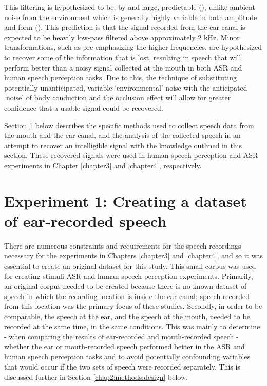 This filtering is hypothesized to be, by and large, predictable (\cite{hansen:97b,reinfeldt:10}), unlike ambient noise from the environment which is generally highly variable in both amplitude and form (\cite{zhang:17}). This prediction is that the signal recorded from the ear canal is expected to be heavily low-pass filtered above approximately 2 kHz.  Minor transformations, such as pre-emphasizing the higher frequencies, are hypothesized to recover some of the information that is lost, resulting in speech that will perform better than a noisy signal collected at the mouth in both ASR and human speech perception tasks.
Due to this, the technique of substituting potentially unanticipated, variable `environmental' noise with the anticipated `noise' of body conduction and the occlusion effect will allow for greater confidence that a usable signal could be recovered.    

Section \ref{expt1} below describes the specific methods used to collect speech data from the mouth and the ear canal, and the analysis of the collected speech in an attempt to recover an intelligible signal with the knowledge outlined in this section.  These recovered signals were used in human speech perception and ASR experiments in Chapter \ref{chapter3} and \ref{chapter4}, respectively.


\section{Experiment 1: Creating a dataset of ear-recorded speech}\label{expt1}

There are numerous constraints and requirements for the speech recordings necessary for the experiments in Chapters \ref{chapter3} and \ref{chapter4}, and so it was essential to create an original dataset for this study.  This small corpus was used for creating stimuli ASR and human speech perception experiments.  Primarily, an original corpus needed to be created because there is no known dataset of speech in which the recording location is inside the ear canal; speech recorded from this location was the primary focus of these studies.  Secondly, in order to be comparable, the speech at the ear, and the speech at the mouth, needed to be recorded at the same time, in the same conditions.  This was mainly to determine - when comparing the results of ear-recorded and mouth-recorded speech - whether the ear or mouth-recorded speech performed better in the ASR and human speech perception tasks and to avoid potentially confounding variables that would occur if the two sets of speech were recorded separately. This is discussed further in Section \ref{chap2:methods:design} below.

